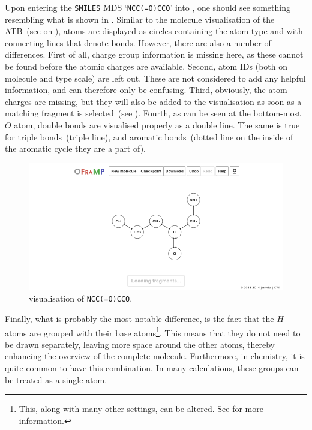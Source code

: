 
Upon entering the \verb|SMILES| MDS `\verb|NCC(=O)CCO|' into \oframp, one should see something resembling what is shown in . Similar to the molecule visualisation of the ATB~(see  on ), atoms are displayed as circles containing the atom type and with connecting lines that denote bonds. However, there are also a number of differences. First of all, charge group information is missing here, as these cannot be found before the atomic charges are available. Second, atom IDs (both on molecule and type scale) are left out. These are not considered to add any helpful information, and can therefore only be confusing. Third, obviously, the atom charges are missing, but they will also be added to the visualisation as soon as a matching fragment is selected~(see ). Fourth, as can be seen at the bottom-most $O$ atom, double bonds are visualised properly as a double line. The same is true for triple bonds~(triple line), and aromatic bonds~(dotted line on the inside of the aromatic cycle they are a part of).

\begin{figure}
\center
\includegraphics[width=.9\textwidth]{img/impl_visualising.png}
\caption{\oframp{} visualisation of \texttt{NCC(=O)CCO}.}
\end{figure}

Finally, what is probably the most notable difference, is the fact that the $H$ atoms are grouped with their base atoms\footnote{This, along with many other settings, can be altered. See  for more information.}. This means that they do not need to be drawn separately, leaving more space around the other atoms, thereby enhancing the overview of the complete molecule. Furthermore, in chemistry, it is quite common to have this combination. In many calculations, these groups can be treated as a single atom.

